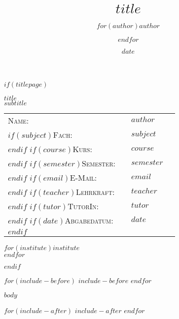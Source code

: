 \documentclass[$if(font-size)$$font-size$$else$12pt$endif$, $if(paper-format)$$paper-format$$else$a4paper$endif$]{article}
\title{$title$}
\author{$for(author)$$author$\and$endfor$}
\date{$date$}
\begin{document}
\onehalfspacing %

$if(titlepage)$
\pagestyle{plain}
\vspace*{2cm}

\begin{center}
  {\huge $title$}\\[1cm]
  {\LARGE $subtitle$}\\[5cm]
\end{center}

\vspace*{2cm}

\begin{tabular}{p{3.5cm}|p{0.1cm} p{10cm}l}
  \textsc{Name:}                   &  & \textsc{$author$}   \\
  $if(subject)$\textsc{Fach:}      &  & \textsc{$subject$}  \\ $endif$
  $if(course)$\textsc{Kurs:}       &  & \textsc{$course$}   \\ $endif$
  $if(semester)$\textsc{Semester:} &  & \textsc{$semester$} \\ $endif$
  $if(email)$\textsc{E-Mail:}      &  & \textsc{$email$}    \\ $endif$
  $if(teacher)$\textsc{Lehrkraft:} &  & \textsc{$teacher$}  \\ $endif$
  $if(tutor)$\textsc{TutorIn:}     &  & \textsc{$tutor$}    \\ $endif$
  $if(date)$\textsc{Abgabedatum:}  &  & \textsc{$date$}     \\ $endif$
\end{tabular}

\vspace*{4cm}

\begin{center}
  $for(institute)$$institute$ \\$endfor$
\end{center}
\clearpage
\pagestyle{$if(pagestyle)$$pagestyle$$else$homework$endif$}
$endif$

$for(include-before)$
$include-before$
$endfor$

$body$

$for(include-after)$
$include-after$
$endfor$
\end{document}
